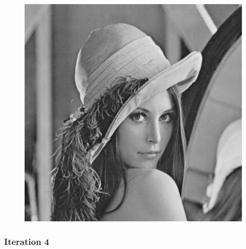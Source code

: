 \documentclass[11pt]{article}
\makeatletter
\def\maxwidth{\ifdim\Gin@nat@width>\linewidth\linewidth
    \else\Gin@nat@width\fi}
\let\Oldincludegraphics\includegraphics
\renewcommand{\includegraphics}[1]{\Oldincludegraphics[width=.8\maxwidth]{#1}}
\makeatother
\begin{document}
\begin{figure}[!htbp]
	\centering
	\includegraphics{"1th iterations_varying"}
	\label{fig:1th-iterationsvarying}
\end{figure}
\clearpage
    \hypertarget{iteration-4}{%
\subsubsection{Iteration 4}\label{iteration-4}}
\end{document}
